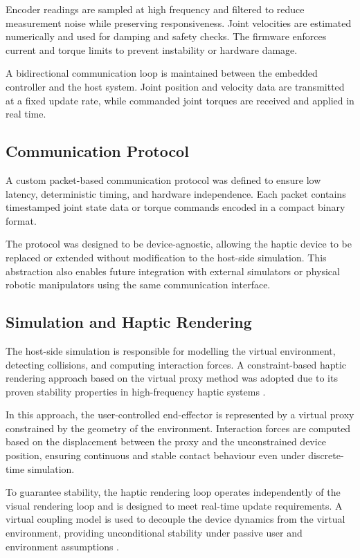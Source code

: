 Encoder readings are sampled at high frequency and filtered to reduce measurement noise while preserving responsiveness. Joint velocities are estimated numerically and used for damping and safety checks. The firmware enforces current and torque limits to prevent instability or hardware damage.

A bidirectional communication loop is maintained between the embedded controller and the host system. Joint position and velocity data are transmitted at a fixed update rate, while commanded joint torques are received and applied in real time. %

\subsection{Communication Protocol}

A custom packet-based communication protocol was defined to ensure low latency, deterministic timing, and hardware independence. Each packet contains timestamped joint state data or torque commands encoded in a compact binary format.

The protocol was designed to be device-agnostic, allowing the haptic device to be replaced or extended without modification to the host-side simulation. This abstraction also enables future integration with external simulators or physical robotic manipulators using the same communication interface.

\subsection{Simulation and Haptic Rendering}

The host-side simulation is responsible for modelling the virtual environment, detecting collisions, and computing interaction forces. A constraint-based haptic rendering approach based on the virtual proxy method was adopted due to its proven stability properties in high-frequency haptic systems \cite{525876,10.1145/258734.258878}.

In this approach, the user-controlled end-effector is represented by a virtual proxy constrained by the geometry of the environment. Interaction forces are computed based on the displacement between the proxy and the unconstrained device position, ensuring continuous and stable contact behaviour even under discrete-time simulation.

To guarantee stability, the haptic rendering loop operates independently of the visual rendering loop and is designed to meet real-time update requirements. A virtual coupling model is used to decouple the device dynamics from the virtual environment, providing unconditional stability under passive user and environment assumptions \cite{768179}.

